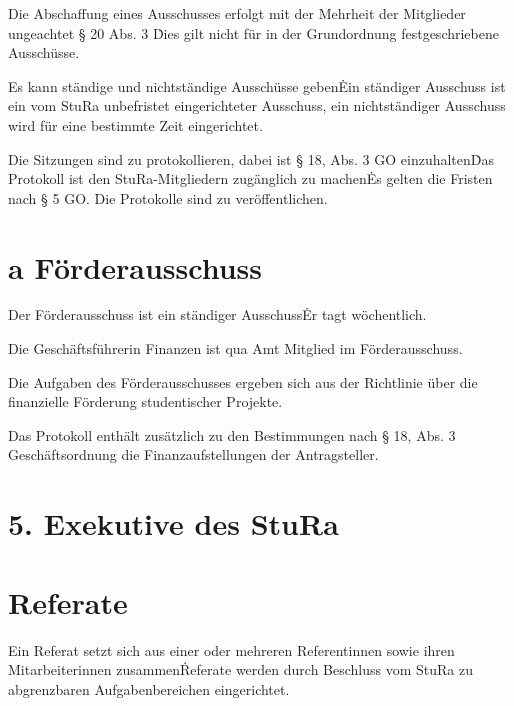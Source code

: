 \begin{multicols}{2}
\Abs \Satz Die Abschaffung eines Ausschusses erfolgt mit der Mehrheit der Mitglieder ungeachtet § 20 Abs. 3 \. Dies gilt nicht für in der Grundordnung festgeschriebene Ausschüsse.

\Abs \Satz Es kann ständige und nichtständige Ausschüsse geben\. Ein ständiger Ausschuss ist ein vom StuRa unbefristet eingerichteter Ausschuss, ein nichtständiger Ausschuss wird für eine bestimmte Zeit eingerichtet.

\Abs \Satz Die Sitzungen sind zu protokollieren, dabei ist § 18, Abs. 3 GO einzuhalten\. Das Protokoll ist den StuRa-Mitgliedern zugänglich zu machen\. Es gelten die Fristen nach § 5 GO. Die Protokolle sind zu veröffentlichen.



\setcounter{section}{23}
\section{a Förderausschuss}

\Abs \Satz Der Förderausschuss ist ein ständiger Ausschuss\. Er tagt wöchentlich.

\Abs \Satz Die Geschäftsführerin Finanzen ist qua Amt Mitglied im Förderausschuss.

\Abs \Satz Die Aufgaben des Förderausschusses ergeben sich aus der Richtlinie über die finanzielle Förderung studentischer Projekte.

\Abs \Satz Das Protokoll enthält zusätzlich zu den Bestimmungen nach § 18, Abs. 3 Geschäftsordnung die Finanzaufstellungen der Antragsteller.



\setcounter{section}{24}

\section*{5. Exekutive des StuRa}



\section{Referate} %

\Abs \Satz Ein Referat setzt sich aus einer oder mehreren Referentinnen sowie ihren Mitarbeiterinnen zusammen\. Referate werden durch Beschluss vom StuRa zu abgrenzbaren Aufgabenbereichen eingerichtet.


\end{multicols}
